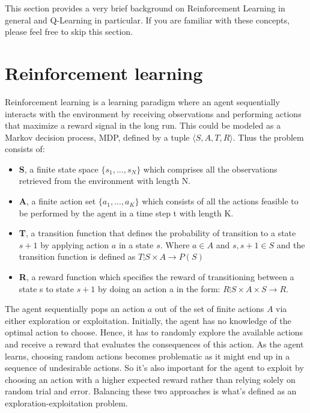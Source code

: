 \label{chapter_background}
This section provides a very brief background on Reinforcement Learning in general and Q-Learning in particular. If you are familiar with these concepts, please feel free to skip this section.

\section{Reinforcement learning} 
\label{sec:RL_BG}
Reinforcement learning is a learning paradigm where an agent sequentially interacts with the environment by receiving observations and performing actions that maximize a reward signal in the long run. \cite {rl_state_of_the_art} This could be modeled as a Markov decision process, MDP, defined by a tuple \(\langle S, A, T, R \rangle\). Thus the problem consists of:
\begin{itemize}
    \item \textbf {S}, a finite state space \(\{s_1,...,s_N\}\) which comprises all the observations retrieved from the environment with length N.
    \item \textbf {A}, a finite action set \(\{a_1,...,a_K\}\) which consists of all the actions feasible to be performed by the agent in a time step t with length K.
    \item \textbf {T}, a transition function that defines the probability of transition to a state \(s+1\) by applying action \(a\) in a state \(s\). Where \(a \in A\) and \(s,s+1 \in S\) and the transition function is defined as  \(T \vdots S \times A \rightarrow P(S)\)
    \item \textbf {R}, a reward function which specifies the reward of transitioning between a state s to state \(s+1\) by doing an action a in the form: \(R \vdots S \times A \times S \rightarrow R\).
\end{itemize}
The agent sequentially pops an action \(a\) out of the set of finite actions \(A\) via either exploration or exploitation. Initially, the agent has no knowledge of the optimal action to choose. Hence, it has to randomly explore the available actions and receive a reward that evaluates the consequences of this action. As the agent learns, choosing random actions becomes problematic as it might end up in a sequence of undesirable actions. So it’s also important for the agent to exploit by choosing an action with a higher expected reward rather than relying solely on random trial and error. Balancing these two approaches is what’s defined as an exploration-exploitation problem. 
\\ \\ 
